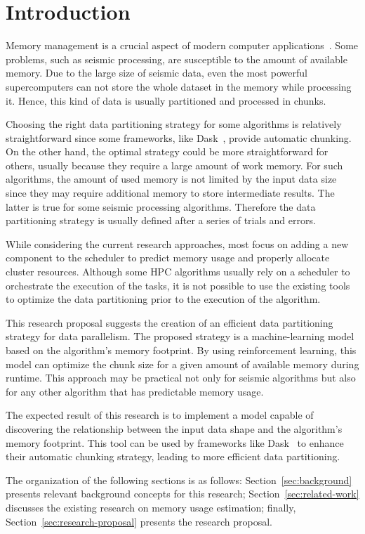 \section{Introduction}
\label{sec:introduction}

Memory management is a crucial aspect of modern computer applications~\cite{pupykina2019}.
Some problems, such as seismic processing, are susceptible to the amount of available memory.
Due to the large size of seismic data, even the most powerful supercomputers can not store the whole dataset in the memory while processing it.
Hence, this kind of data is usually partitioned and processed in chunks.

Choosing the right data partitioning strategy for some algorithms is relatively straightforward since some frameworks, like Dask~\cite{dask}, provide automatic chunking.
On the other hand, the optimal strategy could be more straightforward for others, usually because they require a large amount of work memory.
For such algorithms, the amount of used memory is not limited by the input data size since they may require additional memory to store intermediate results.
The latter is true for some seismic processing algorithms.
Therefore the data partitioning strategy is usually defined after a series of trials and errors.

While considering the current research approaches, most focus on adding a new component to the scheduler to predict memory usage and properly allocate cluster resources.
Although some \ac{HPC} algorithms usually rely on a scheduler to orchestrate the execution of the tasks, it is not possible to use the existing tools to optimize the data partitioning prior to the execution of the algorithm.

This research proposal suggests the creation of an efficient data partitioning strategy for data parallelism.
The proposed strategy is a machine-learning model based on the algorithm's memory footprint.
By using reinforcement learning, this model can optimize the chunk size for a given amount of available memory during runtime.
This approach may be practical not only for seismic algorithms but also for any other algorithm that has predictable memory usage.

The expected result of this research is to implement a model capable of discovering the relationship between the input data shape and the algorithm's memory footprint.
This tool can be used by frameworks like Dask~\cite{dask} to enhance their automatic chunking strategy, leading to more efficient data partitioning.

The organization of the following sections is as follows:
Section~\ref{sec:background} presents relevant background concepts for this research;
Section~\ref{sec:related-work} discusses the existing research on memory usage estimation;
finally, Section~\ref{sec:research-proposal} presents the research proposal.
